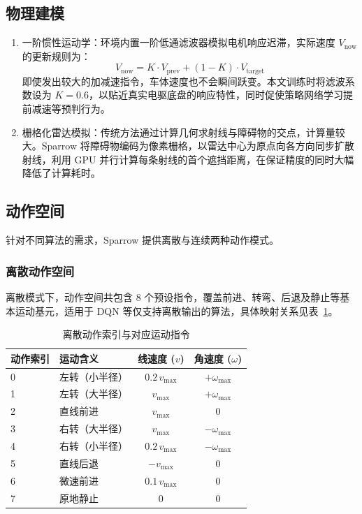 \subsection{物理建模}

\begin{enumerate}
    \item 一阶惯性运动学：环境内置一阶低通滤波器模拟电机响应迟滞，实际速度 $V_{\text{now}}$ 的更新规则为：
    \begin{equation}
        V_{\text{now}} = K \cdot V_{\text{prev}} + (1-K) \cdot V_{\text{target}}
    \end{equation}
    即使发出较大的加减速指令，车体速度也不会瞬间跃变。本文训练时将滤波系数设为 $K=0.6$，以贴近真实电驱底盘的响应特性，同时促使策略网络学习提前减速等预判行为。
    \item 栅格化雷达模拟：传统方法通过计算几何求射线与障碍物的交点，计算量较大。Sparrow 将障碍物编码为像素栅格，以雷达中心为原点向各方向同步扩散射线，利用 GPU 并行计算每条射线的首个遮挡距离，在保证精度的同时大幅降低了计算耗时。
\end{enumerate}

\subsection{动作空间}

针对不同算法的需求，Sparrow 提供离散与连续两种动作模式。

\subsubsection{离散动作空间}

离散模式下，动作空间共包含 8 个预设指令，覆盖前进、转弯、后退及静止等基本运动基元，适用于 DQN 等仅支持离散输出的算法，具体映射关系见表~\ref{tab:discrete_action}。

\begin{table}[H]
    \centering
    \caption{离散动作索引与对应运动指令}
    \label{tab:discrete_action}
    \begin{tabular}{llcc}
        \toprule
        \textbf{动作索引} & \textbf{运动含义} & \textbf{线速度 ($v$)} & \textbf{角速度 ($\omega$)} \\
        \midrule
        0 & 左转（小半径） & $0.2\,v_{\max}$ & $+\omega_{\max}$ \\
        1 & 左转（大半径） & $v_{\max}$ & $+\omega_{\max}$ \\
        2 & 直线前进 & $v_{\max}$ & $0$ \\
        3 & 右转（大半径） & $v_{\max}$ & $-\omega_{\max}$ \\
        4 & 右转（小半径） & $0.2\,v_{\max}$ & $-\omega_{\max}$ \\
        5 & 直线后退 & $-v_{\max}$ & $0$ \\
        6 & 微速前进 & $0.1\,v_{\max}$ & $0$ \\
        7 & 原地静止 & $0$ & $0$ \\
        \bottomrule
    \end{tabular}
\end{table}

